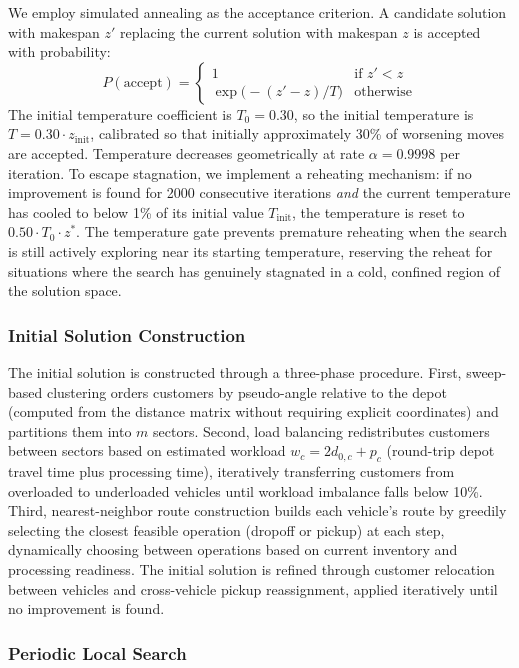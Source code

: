 \documentclass{article}
\begin{document}
We employ simulated annealing as the acceptance criterion. A candidate solution with makespan $z'$ replacing the current solution with makespan $z$ is accepted with probability:
\[
P(\text{accept}) = \begin{cases}
1 & \text{if } z' < z \\
\exp\!\bigl(-(z' - z)/T\bigr) & \text{otherwise}
\end{cases}
\]
The initial temperature coefficient is $T_0 = 0.30$, so the initial temperature is $T = 0.30 \cdot z_{\text{init}}$, calibrated so that initially approximately 30\% of worsening moves are accepted. Temperature decreases geometrically at rate $\alpha = 0.9998$ per iteration. To escape stagnation, we implement a reheating mechanism: if no improvement is found for 2000 consecutive iterations \emph{and} the current temperature has cooled to below 1\% of its initial value $T_{\text{init}}$, the temperature is reset to $0.50 \cdot T_0 \cdot z^*$. The temperature gate prevents premature reheating when the search is still actively exploring near its starting temperature, reserving the reheat for situations where the search has genuinely stagnated in a cold, confined region of the solution space.

\subsubsection{Initial Solution Construction}

The initial solution is constructed through a three-phase procedure. First, sweep-based clustering orders customers by pseudo-angle relative to the depot (computed from the distance matrix without requiring explicit coordinates) and partitions them into $m$ sectors. Second, load balancing redistributes customers between sectors based on estimated workload $w_c = 2 d_{0,c} + p_c$ (round-trip depot travel time plus processing time), iteratively transferring customers from overloaded to underloaded vehicles until workload imbalance falls below 10\%. Third, nearest-neighbor route construction builds each vehicle's route by greedily selecting the closest feasible operation (dropoff or pickup) at each step, dynamically choosing between operations based on current inventory and processing readiness. The initial solution is refined through customer relocation between vehicles and cross-vehicle pickup reassignment, applied iteratively until no improvement is found.

\subsubsection{Periodic Local Search}
\end{document}
